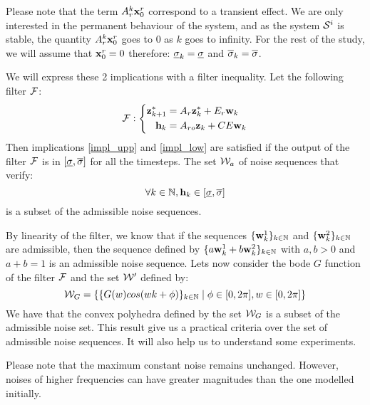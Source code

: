 Please note that the term $A_r^k  \mathbf{x}^r_0$ correspond to a transient effect. We are only interested in the permanent behaviour of the system, and as the system $\mathcal{S}^i$ is stable, the quantity $A_r^k  \mathbf{x}^r_0$ goes to 0 as $k$ goes to infinity. For the rest of the study, we will assume that $ \mathbf{x}^r_0 = 0$ therefore: $\underline{\sigma}_k = \underline{\sigma}$ and $\overline{\sigma}_k = \overline{\sigma}$.

We will express these 2 implications with a filter inequality.
Let the following filter $\mathcal{F}$:
\begin{equation}
\mathcal{F}:
\left\{
\begin{split}
 \mathbf{z}_{k+1}^* &= A_r  \mathbf{z}_k^* + E_r  \mathbf{w}_{k} \\
 \mathbf{h}_{k} &= A_{ro}  \mathbf{z}_k + CE  \mathbf{w}_{k} \\
\end{split}
\right.
\end{equation}
Then implications \ref{impl_upp} and \ref{impl_low} are satisfied if the output of the filter $\mathcal{F}$ is in $[\underline{\sigma},\overline{\sigma}]$ for all the timesteps.
The set $\mathcal{W}_a$ of noise sequences that verify:
\begin{equation}
\forall k \in \mathbb{N},  \mathbf{h}_k \in [\underline{\sigma},\overline{\sigma}]
\end{equation}
is a subset of the admissible noise sequences.

By linearity of the filter, we know that if the sequences $\{ \mathbf{w}_{k}^1\}_{k\in \mathbb{N}}$ and  $\{ \mathbf{w}_{k}^2\}_{k\in \mathbb{N}}$ are admissible, then the sequence defined by $\{a \mathbf{w}_{k}^1 + b \mathbf{w}_{k}^2\}_{k\in \mathbb{N}}$ with $a,b>0$ and $a+b = 1$ is an admissible noise sequence.
Lets now consider the bode $G$ function of the filter $\mathcal{F}$ and the set $\mathcal{W}'$ defined by:
$$\mathcal{W}_G = 
\{ 
\{G(w) cos(w k + \phi)\}_{k \in \mathbb{N}} 
\mid \phi \in [0,2\pi], w \in [0,2\pi] \}
$$
We have that the convex polyhedra defined by the set $\mathcal{W}_G$ is a subset of the admissible noise set.
This result give us a practical criteria over the set of admissible noise sequences.
It will also help us to understand some experiments.

Please note that the maximum constant noise remains unchanged.
However, noises of higher frequencies can have greater magnitudes than the one modelled initially. 